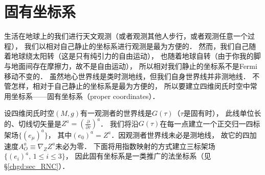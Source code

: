 %
%
%
%


\section{固有坐标系}\label{chfd:sec_proper-coord}
生活在地球上的我们进行天文观测（或者观测其他人步行，或者观测任意一个过程），
我们以相对自己静止的坐标系进行观测是最为方便的．
然而，我们自己随着地球绕太阳转（这是只有纯引力的自由运动），
也随着地球自转（由于你我的脚与地面间存在摩擦力，故不是自由运动），
所以相对我们静止的坐标系不是Fermi移动不变的．
虽然地心世界线是类时测地线，但我们自身世界线并非测地线．
不管怎样，相对于自己静止的坐标系是最为方便的，
所以要建立四维闵氏时空中常用坐标系——{\heiti 固有坐标系}\cite[\S 13.6]{mtw1973}（proper coordinates）．

设四维闵氏时空$(M,g)$有一观测者的世界线是$G(\tau)$（$\tau$是固有时），
此线单位长的、切线切矢量是$Z^a=(\frac{\partial }{\partial \tau})^a$．
我们将沿$G(\tau)$在每一点建立一个正交归一四标架场$\{(e_\mu)^a\}$，
其中$(e_0)^a=Z^a$．因观测者世界线未必是测地线，
故它的四加速度$A_O ^a \equiv \nabla_Z Z^a$未必为零．
下面将用指数映射的方式建立三标架场$\{(e_i)^a,\, 1\leqslant i \leqslant 3\}$，
因此固有坐标系是一类推广的法坐标系（见\S\ref{chgd:sec_RNC}）．

